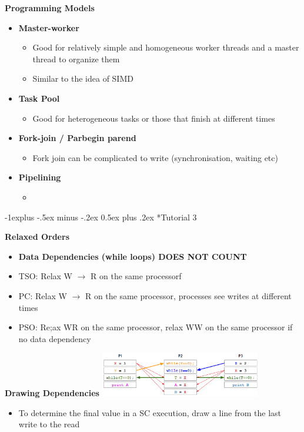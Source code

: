 \documentclass[10pt, landscape]{article}
\makeatletter
\renewcommand{\subsection}{\@startsection{subsection}{2}{0mm}%
                                {-1explus -.5ex minus -.2ex}%
                                {0.5ex plus .2ex}%
                                {\normalfont\normalsize\bfseries}}
\makeatother
\begin{document}
\begin{multicols}{4}
\textbf{Programming Models}
\begin{itemize}
    \item \textbf{Master-worker}
    \begin{itemize}
        \item Good for relatively simple and homogeneous worker threads and a master thread to organize them
        \item Similar to the idea of SIMD 
    \end{itemize}
    \item \textbf{Task Pool}
    \begin{itemize}
        \item Good for heterogeneous tasks or those that finish at different times 
    \end{itemize}
    \item \textbf{Fork-join / Parbegin parend}
    \begin{itemize}
        \item Fork join can be complicated to write (synchronisation, waiting etc)
    \end{itemize}
    \item \textbf{Pipelining}
    \begin{itemize}
        \item 
    \end{itemize}
\end{itemize}

\subsection*{Tutorial 3}

\textbf{Relaxed Orders}
\begin{itemize}
    \item \textbf{Data Dependencies (while loops) DOES NOT COUNT}
    \item TSO: Relax W $\rightarrow$ R on the same processorf
    \item PC: Relax W $\rightarrow$ R on the same processor, processes see writes at different times
    \item PSO: Re;ax WR on the same processor, relax WW on the same processor if no data dependency
\end{itemize}


\textbf{Drawing Dependencies}
\includegraphics*[width=7cm]{drawing_dependencies.png}
\begin{itemize}
    \item To determine the final value in a SC execution, draw a line from the last write to the read
\end{itemize}



\end{multicols}
\end{document}
